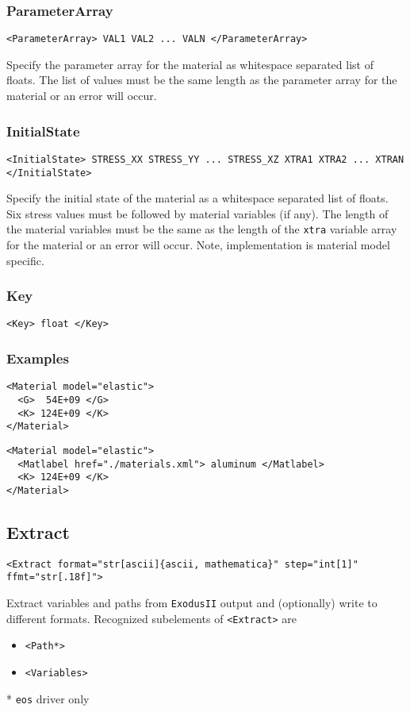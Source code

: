 \documentclass[11pt]{report}
\newcommand{\exodusii}{{\sc\texttt{ExodusII}}}
\renewcommand{\tag}[1]{\texttt{<#1>}}
\begin{document}
\subsubsection{ParameterArray}
\begin{verbatim}
<ParameterArray> VAL1 VAL2 ... VALN </ParameterArray>
\end{verbatim}
%
Specify the parameter array for the material as whitespace separated list of
floats.  The list of values must be the same length as the parameter array for
the material or an error will occur.

\subsubsection{InitialState}
\begin{verbatim}
<InitialState> STRESS_XX STRESS_YY ... STRESS_XZ XTRA1 XTRA2 ... XTRAN </InitialState>
\end{verbatim}
%
Specify the initial state of the material as a whitespace separated list of
floats. Six stress values must be followed by material variables (if any). The
length of the material variables must be the same as the length of the
\texttt{xtra} variable array for the material or an error will occur.  Note,
implementation is material model specific.

\subsubsection{Key}
\begin{verbatim}
<Key> float </Key>
\end{verbatim}

\subsubsection{Examples}
\begin{verbatim}
<Material model="elastic">
  <G>  54E+09 </G>
  <K> 124E+09 </K>
</Material>
\end{verbatim}

\begin{verbatim}
<Material model="elastic">
  <Matlabel href="./materials.xml"> aluminum </Matlabel>
  <K> 124E+09 </K>
</Material>
\end{verbatim}

\subsection{Extract}
\begin{verbatim}
<Extract format="str[ascii]{ascii, mathematica}" step="int[1]" ffmt="str[.18f]">
\end{verbatim}
%
Extract variables and paths from \exodusii{} output and (optionally) write to
different formats. Recognized subelements of \tag{Extract} are
%
\begin{itemize}
  \item \tag{Path*}
  \item \tag{Variables}
\end{itemize}
%
* \texttt{eos} driver only
\end{document}
